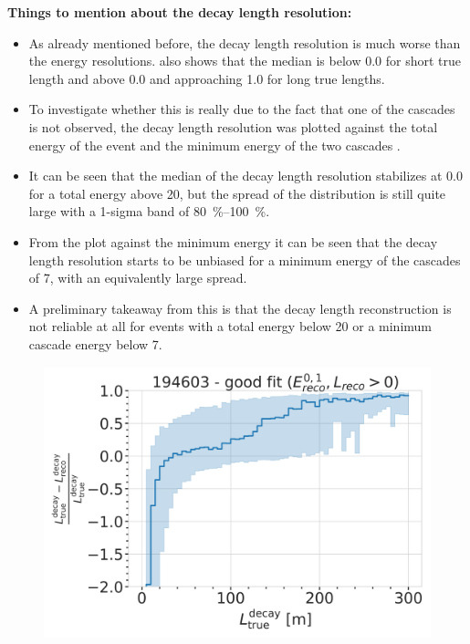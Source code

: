 \textbf{Things to mention about the decay length resolution:}
\begin{itemize}
    \item As already mentioned before, the decay length resolution is much worse than the energy resolutions.  also shows that the median is below 0.0 for short true length and above 0.0 and approaching 1.0 for long true lengths.
    \item To investigate whether this is really due to the fact that one of the cascades is not observed, the decay length resolution was plotted against the total energy of the event and the minimum energy of the two cascades .
    \item It can be seen that the median of the decay length resolution stabilizes at 0.0 for a total energy above \SI{20}{\gev}, but the spread of the distribution is still quite large with a 1-sigma band of \SIrange{80}{100}{\percent}.
    \item From the plot against the minimum energy it can be seen that the decay length resolution starts to be unbiased for a minimum energy of the cascades of \SI{7}{\gev}, with an equivalently large spread.
    \item A preliminary takeaway from this is that the decay length reconstruction is not reliable at all for events with a total energy below \SI{20}{\gev} or a minimum cascade energy below \SI{7}{\gev}.
\end{itemize}

\begin{figure}[h]
	\centering
    \includegraphics{figures/model_independent_simulation/results/realistic/resolutions/194603_median_decay_length_bias_goodfit_log_unweighted.png}
    \caption[]{}
\end{figure}


